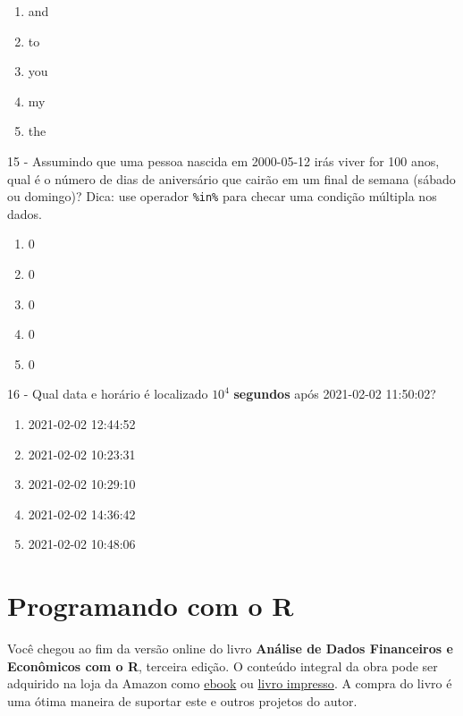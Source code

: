 \documentclass[
  11pt,
]{book}
\providecommand{\tightlist}{%
  \setlength{\itemsep}{0pt}\setlength{\parskip}{0pt}}
\newenvironment{pleasebuyit}
{\begin{noteblock}
		
	} {\end{noteblock}}
\begin{document}
\begin{enumerate}
\def\labelenumi{\alph{enumi})}
\tightlist
\item
  and
\item
  to
\item
  you
\item
  my
\item
  the
\end{enumerate}

15 -
Assumindo que uma pessoa nascida em 2000-05-12 irás viver for 100 anos, qual é o número de dias de aniversário que cairão em um final de semana (sábado ou domingo)? Dica: use operador \texttt{\%in\%} para checar uma condição múltipla nos dados.

\begin{enumerate}
\def\labelenumi{\alph{enumi})}
\tightlist
\item
  0
\item
  0
\item
  0
\item
  0
\item
  0
\end{enumerate}

16 -
Qual data e horário é localizado \ensuremath{10^{4}} \textbf{segundos} após 2021-02-02 11:50:02?

\begin{enumerate}
\def\labelenumi{\alph{enumi})}
\tightlist
\item
  2021-02-02 12:44:52
\item
  2021-02-02 10:23:31
\item
  2021-02-02 10:29:10
\item
  2021-02-02 14:36:42
\item
  2021-02-02 10:48:06
\end{enumerate}

\hypertarget{programacao}{%
\chapter{Programando com o R}\label{programacao}}

\begin{pleasebuyit}
Você chegou ao fim da versão online do livro \textbf{Análise de Dados
Financeiros e Econômicos com o R}, terceira edição. O conteúdo integral
da obra pode ser adquirido na loja da Amazon como
\href{https://www.amazon.com.br/dp/B08WNC27ZY}{ebook} ou
\href{https://www.amazon.com/dp/B08WP8CCDB}{livro impresso}. A compra do
livro é uma ótima maneira de suportar este e outros projetos do autor.
\end{pleasebuyit}
\end{document}
